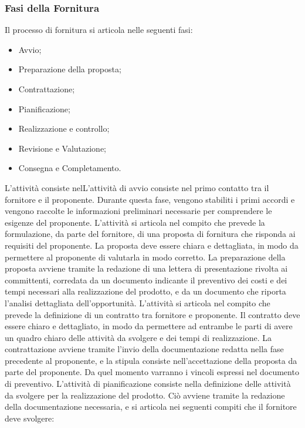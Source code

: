 \subsubsection{Fasi della Fornitura}
\label{sec:Fasi della Fornitura}
Il processo di fornitura si articola nelle seguenti fasi:
\begin{itemize}
    \item Avvio;
    \item Preparazione della proposta;
    \item Contrattazione;
    \item Pianificazione;
    \item Realizzazione e controllo;
    \item Revisione e Valutazione;
    \item Consegna e Completamento.
\end{itemize}
L'attività consiste nelL'attività di avvio consiste nel primo contatto tra il fornitore e il proponente. Durante questa fase, vengono stabiliti i primi accordi e vengono raccolte le informazioni preliminari necessarie per comprendere le esigenze del proponente.
L'attività si articola nel compito che prevede la formulazione, da parte del fornitore, di una proposta di fornitura che risponda ai requisiti del proponente. La proposta deve essere chiara e dettagliata, in modo da permettere al proponente di valutarla in modo corretto. La preparazione della proposta avviene tramite la redazione di una lettera di presentazione rivolta ai committenti, corredata da un documento indicante il preventivo dei costi e dei tempi necessari alla realizzazione del prodotto, e da un documento che riporta l'analisi dettagliata dell'opportunità.
L'attività si articola nel compito che prevede la definizione di un contratto tra fornitore e proponente. Il contratto deve essere chiaro e dettagliato, in modo da permettere ad entrambe le parti di avere un quadro chiaro delle attività da svolgere e dei tempi di realizzazione. La contrattazione avviene tramite l'invio della documentazione redatta nella fase precedente al proponente, e la stipula consiste nell'accettazione della proposta da parte del proponente. Da quel momento varranno i vincoli espressi nel documento di preventivo.
L'attività di pianificazione consiste nella definizione delle attività da svolgere per la realizzazione del prodotto. Ciò avviene tramite la redazione della documentazione necessaria, e si articola nei seguenti compiti che il fornitore deve svolgere:

